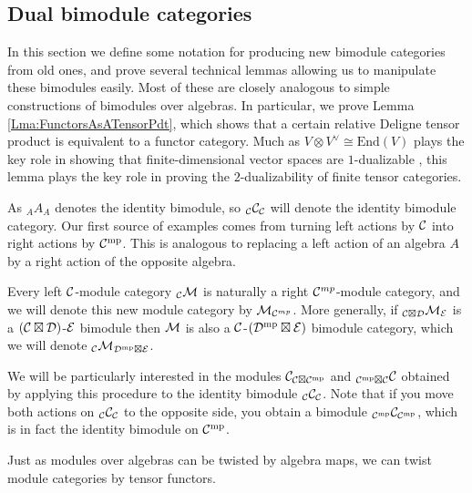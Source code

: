 \documentclass{amsart}
\begin{document}
\subsection{Dual bimodule categories} \label{sec:tc-bimodules} 

In this section we define some notation for producing new bimodule categories from old ones, and prove several technical lemmas allowing us to manipulate these bimodules easily.  Most of these are closely analogous to simple constructions of bimodules over algebras.  In particular, we prove Lemma \ref{Lma:FunctorsAsATensorPdt}, which shows that a certain relative Deligne tensor product is equivalent to a functor category.  Much as $V \otimes V^\vee \cong \mathrm{End}(V)$ plays the key role in showing that finite-dimensional vector spaces are $1$-dualizable \cite[Ex. 1.1.9]{lurie-ch}, this lemma plays the key role in proving the $2$-dualizability of finite tensor categories.

As ${}_A A_A$ denotes the identity bimodule, so ${}_\mathcal C \mathcal C_{\mathcal C}$ will denote the identity bimodule category.  Our first source of examples comes from turning left actions by $\mathcal C$ into right actions by $\mathcal C^{\mathrm{mp}}$.  This is analogous to replacing a left action of an algebra $A$ by a right action of the opposite algebra.

\begin{definition}
Every left $\mathcal C$-module category ${}_\mathcal C \mathcal M$ is naturally a right $\mathcal C^{mp}$-module category, and we will denote this new module category by $\mathcal M_{\mathcal C^{mp}}$.  More generally, if ${}_{\mathcal C \boxtimes \mathcal D} \mathcal M_{\mathcal E}$ is a $(\mathcal C \boxtimes \mathcal D)$-$\mathcal E$ bimodule then $\mathcal M$ is also a $\mathcal C$-$(\mathcal D^{\mathrm{mp}} \boxtimes \mathcal E)$ bimodule category, which we will denote ${}_{\mathcal C}\mathcal M_{\mathcal D^{\mathrm{mp}} \boxtimes \mathcal E}$.
\end{definition}

We will be particularly interested in the modules $\mathcal C_{\mathcal C \boxtimes \mathcal C^{\mathrm{mp}}}$ and ${}_{\mathcal C^{\mathrm{mp}} \boxtimes \mathcal C} \mathcal C$ obtained by applying this procedure to the identity bimodule ${}_\mathcal C \mathcal C_\mathcal C$.  Note that if you move both actions on ${}_\mathcal C \mathcal C_\mathcal C$ to the opposite side, you obtain a bimodule ${}_{\mathcal C^{\mathrm{mp}}}\mathcal C_{\mathcal C^{\mathrm{mp}}}$, which is in fact the identity bimodule on $\mathcal C^{\mathrm{mp}}$.

Just as modules over algebras can be twisted by algebra maps, we can twist module categories by tensor functors.
\end{document}
